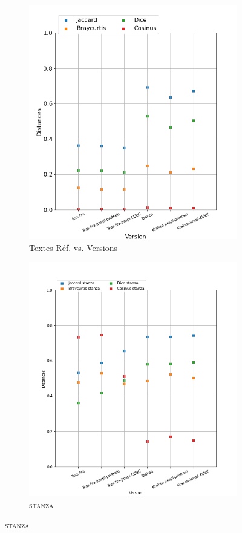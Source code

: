 \begin{figure}[H]
\begin{minipage}{6cm}
  \begin{subfigure}{0.89\textwidth}
  \includegraphics[width=.89\textwidth]{IMAGES/ELTeC_DISTANCES_spaCy3.5.1/MAUPASSANT-graph-dist-spaCy3.5.1-txt.png} 
  \caption{Textes Réf. vs. Versions}
  \label{fig:MAUPASSANT-graph-dist-txt}
  \end{subfigure}
  \end{minipage}
  \begin{minipage}{6cm}
  \begin{subfigure}{0.89\textwidth}
  \includegraphics[width=.89\textwidth]{IMAGES/ELTeC_DISTANCES_stanza/MAUPASSANT-graph-dist-stanza-stanza.png}
   \caption{\textsc{stanza}}
 

\end{subfigure}
\end{minipage}
\end{figure}
